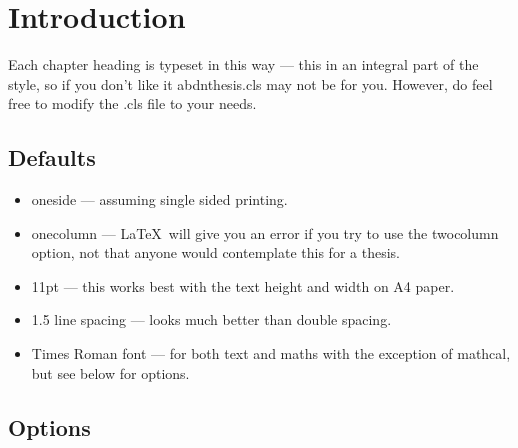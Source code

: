 \chapter{Introduction\label{chap:introduction}}

Each chapter heading is typeset in this way --- this in an integral
part of the style, so if you don't like it abdnthesis.cls may not be
for you. However, do feel free to modify the .cls file to your needs.

\section{Defaults}

\begin{itemize}
\item oneside --- assuming single sided printing.

\item onecolumn --- \LaTeX\ will give you an error if you try to use
  the twocolumn option, not that anyone would contemplate this for a
  thesis.

\item 11pt --- this works best with the text height and width on A4
  paper.

\item 1.5 line spacing --- looks much better than double spacing.

\item Times Roman font --- for both text and maths with the exception
  of mathcal, but see below for options.
\end{itemize}

\section{Options}

